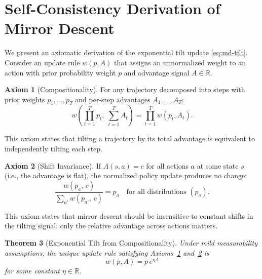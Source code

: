 \documentclass{article}
\theoremstyle{plain}
\newtheorem{theorem}{Theorem}[section]
\theoremstyle{definition}
\newtheorem{axiom}[theorem]{Axiom}
\theoremstyle{remark}
\newcommand{\R}{\mathbb{R}}
\begin{document}



\appendix

\section{Self-Consistency Derivation of Mirror Descent}
\label{sec:self-consistency}

We present an axiomatic derivation of the exponential tilt update \cref{eq:md-tilt}. Consider an update rule $w(p, A)$ that assigns an unnormalized weight to an action with prior probability weight $p$ and advantage signal $A \in \R$.

\begin{axiom}[Compositionality]\label{ax:comp}
For any trajectory decomposed into steps with prior weights $p_1, \ldots, p_T$ and per-step advantages $A_1, \ldots, A_T$:
\[
  w\!\left(\prod_{t=1}^T p_t,\; \sum_{t=1}^T A_t\right) = \prod_{t=1}^T w(p_t, A_t).
\]
\end{axiom}

This axiom states that tilting a trajectory by its total advantage is equivalent to independently tilting each step.

\begin{axiom}[Shift Invariance]\label{ax:neut}
If $A(s,a) = c$ for all actions $a$ at some state $s$ (i.e., the advantage is flat), the normalized policy update produces no change:
\[
  \frac{w(p_a,\, c)}{\sum_{a'} w(p_{a'},\, c)} = p_a \quad \text{for all distributions } (p_a).
\]
\end{axiom}

This axiom states that mirror descent should be insensitive to constant shifts in the tilting signal: only the relative advantage across actions matters.

\begin{theorem}[Exponential Tilt from Compositionality]\label{thm:main}
Under mild measurability assumptions, the unique update rule satisfying Axioms~\ref{ax:comp} and~\ref{ax:neut} is
\[
  w(p, A) = p\,e^{\eta A}
\]
for some constant $\eta \in \R$.
\end{theorem}
\end{document}
